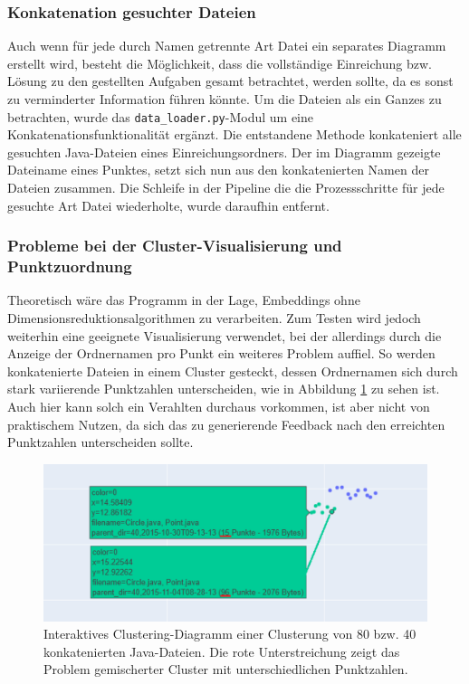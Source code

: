 \subsubsection*{Konkatenation gesuchter Dateien}
Auch wenn für jede durch Namen getrennte Art Datei ein separates Diagramm erstellt wird, besteht die Möglichkeit, dass die vollständige Einreichung bzw. Lösung zu den gestellten Aufgaben gesamt betrachtet, werden sollte, da es sonst zu verminderter Information führen könnte. Um die Dateien als ein Ganzes zu betrachten, wurde das \texttt{data\_loader.py}-Modul um eine Konkatenationsfunktionalität ergänzt. Die entstandene Methode konkateniert alle gesuchten Java-Dateien eines Einreichungsordners. Der im Diagramm gezeigte Dateiname eines Punktes, setzt sich nun aus den konkatenierten Namen der Dateien zusammen. Die Schleife in der Pipeline die die Prozessschritte für jede gesuchte Art Datei wiederholte, wurde daraufhin entfernt.


\subsubsection*{Probleme bei der Cluster-Visualisierung und Punktzuordnung}
Theoretisch wäre das Programm in der Lage, Embeddings ohne Dimensionsreduktionsalgorithmen zu verarbeiten. Zum Testen wird jedoch weiterhin eine geeignete Visualisierung verwendet, bei der allerdings durch die Anzeige der Ordnernamen pro Punkt ein weiteres Problem auffiel. So werden konkatenierte Dateien in einem Cluster gesteckt, dessen Ordnernamen sich durch stark variierende Punktzahlen unterscheiden, wie in Abbildung \ref{abb:C-40-K-Pg} zu sehen ist. Auch hier kann solch ein Verahlten durchaus vorkommen, ist aber nicht von praktischem Nutzen, da sich das zu generierende Feedback nach den erreichten Punktzahlen unterscheiden sollte. 

\begin{figure} %
	\centering
	\includegraphics[width=1.0\textwidth]{images/Clusterung - 40 - Konkateniert - Punktzahl gemischt.pdf}
	\caption{Interaktives Clustering-Diagramm einer Clusterung von 80 bzw. 40 konkatenierten Java-Dateien. Die rote Unterstreichung zeigt das Problem gemischerter Cluster mit unterschiedlichen Punktzahlen.}
	\label{abb:C-40-K-Pg}
\end{figure}


